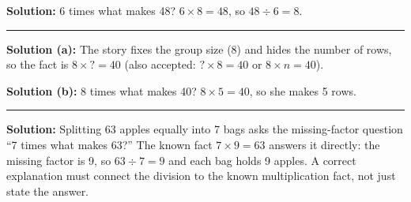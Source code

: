 \documentclass[12pt]{article}
\begin{document}
\textbf{Solution:} 6 times what makes 48? $6 \times 8 = 48$, so $48 \div 6 = 8$. 

\noindent\rule{\linewidth}{0.2pt}


\textbf{Solution (a):} The story fixes the group size (8) and hides the number of rows, so the fact is $8 \times \textbf{?} = 40$ (also accepted: $\textbf{?} \times 8 = 40$ or $8 \times n = 40$).

\textbf{Solution (b):} 8 times what makes 40? $8 \times 5 = 40$, so she makes 5 rows. 

\noindent\rule{\linewidth}{0.2pt}


\textbf{Solution:} Splitting 63 apples equally into 7 bags asks the missing-factor question ``7 times what makes 63?'' The known fact $7 \times 9 = 63$ answers it directly: the missing factor is 9, so $63 \div 7 = 9$ and each bag holds 9 apples. A correct explanation must connect the division to the known multiplication fact, not just state the answer. 
\end{document}

